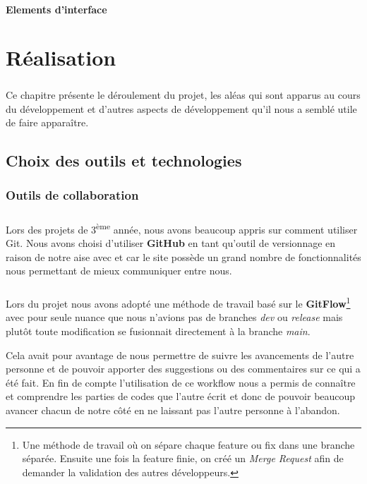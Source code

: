 \documentclass{EPUProjetDi}
\begin{document}
\subsubsection{Elements d'interface}

\chapter{Réalisation}

\paragraph{}
Ce chapitre présente le déroulement du projet, les aléas qui sont apparus au cours du 
développement et d'autres aspects de développement qu'il nous a semblé 
utile de faire apparaître.

\section{Choix des outils et technologies}

\subsection{Outils de collaboration}

\paragraph{}
Lors des projets de 3\textsuperscript{ème} année, nous avons beaucoup appris sur comment utiliser
Git. Nous avons choisi d'utiliser \textbf{GitHub} en tant qu'outil de versionnage en raison de notre aise avec et
car le site possède un grand nombre de fonctionnalités nous permettant de mieux communiquer entre
nous.

\paragraph{}
Lors du projet nous avons adopté une méthode de travail basé sur le \textbf{GitFlow}\footnote{Une méthode de travail où on sépare chaque feature ou fix dans une branche séparée.
Ensuite une fois la feature finie, on créé un \textit{Merge Request} afin de demander la validation des autres développeurs.} avec pour seule nuance que nous n'avions pas de branches \textit{dev} ou \textit{release}
mais plutôt toute modification se fusionnait directement à la branche \textit{main}.

Cela avait pour avantage de nous permettre de suivre les avancements de l'autre personne et de pouvoir 
apporter des suggestions ou des commentaires sur ce qui a été fait. 
En fin de compte l'utilisation de ce workflow nous a permis de connaître et comprendre 
les parties de codes que l'autre écrit et donc de pouvoir beaucoup avancer chacun de notre
côté en ne laissant pas l'autre personne à l'abandon.
\end{document}
